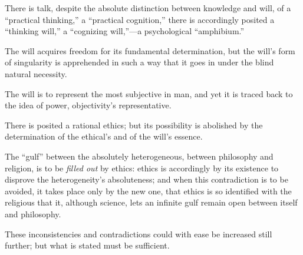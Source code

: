 \documentclass[12pt,a4paper]{book}
\begin{document}
There is talk, despite the absolute distinction between knowledge and will, of a ``practical thinking,''
a ``practical cognition,'' there is accordingly posited a ``thinking will,'' a ``cognizing will,''---a
psychological ``amphibium.''

The will acquires freedom for its fundamental determination, but the will's form of singularity is
apprehended in such a way that it goes in under the blind natural necessity.

The will is to represent the most subjective in man, and yet it is traced back to the idea of power,
objectivity's representative.

There is posited a rational ethics; but its possibility is abolished by the determination of the
ethical's and of the will's essence.

The ``gulf'' between the absolutely heterogeneous, between philosophy and religion, is to be \emph{filled out}
by ethics: ethics is accordingly by its existence to disprove the heterogeneity's absoluteness; and
when this contradiction is to be avoided, it takes place only by the new one, that ethics is so
identified with the religious that it, although science, lets an infinite gulf remain open between
itself and philosophy.

These inconsistencies and contradictions could with ease be increased still further; but what is stated
must be sufficient.
\end{document}
